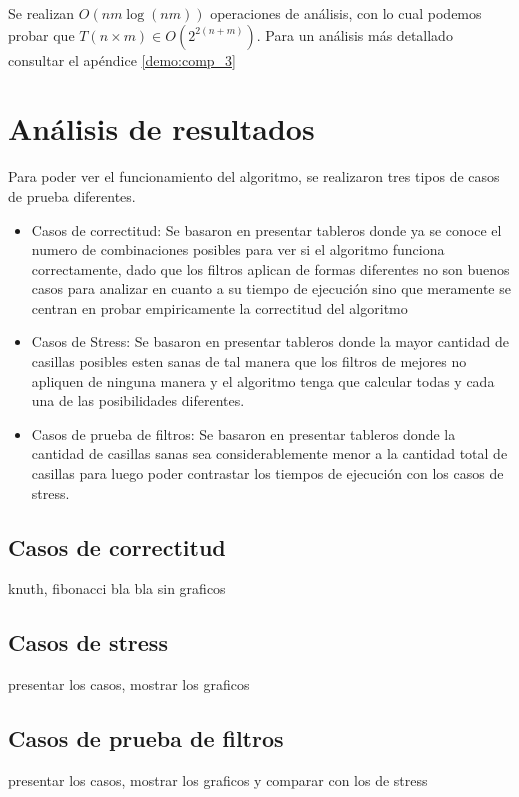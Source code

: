 \documentclass[a4paper, 12pt] {article}
\begin{document}
Se realizan $O\left( nm \log\left(  nm \right) \right) $ operaciones de an\'alisis, con lo cual podemos probar que $T\left( n \times m\right) \in O(2^{2\left( n+m\right) })$. Para un an\'alisis m\'as detallado consultar el ap\'endice \ref{demo:comp_3}



\section*{An\'alisis de resultados}
Para poder ver el funcionamiento del algoritmo, se realizaron tres tipos de casos de prueba diferentes.

\begin{itemize}
 \item Casos de correctitud: Se basaron en presentar tableros donde ya se conoce el numero de combinaciones posibles para ver si el algoritmo funciona correctamente, dado que los filtros aplican de formas diferentes no son buenos casos para analizar en cuanto a su tiempo de ejecuci\'on sino que meramente se centran en probar empiricamente la correctitud del algoritmo
\item Casos de Stress: Se basaron en presentar tableros donde la mayor cantidad de casillas posibles esten sanas de tal manera que los filtros de mejores no apliquen de ninguna manera y el algoritmo tenga que calcular todas y cada una de las posibilidades diferentes.
\item Casos de prueba de filtros: Se basaron en presentar tableros donde la cantidad de casillas sanas sea considerablemente menor a la cantidad total de casillas para luego poder contrastar los tiempos de ejecuci\'on con los casos de stress.
\end{itemize}


\subsection*{Casos de correctitud}
knuth, fibonacci bla bla
sin graficos

\subsection*{Casos de stress}
presentar los casos, mostrar los graficos

\subsection*{Casos de prueba de filtros}
presentar los casos, mostrar los graficos y comparar con los de stress
\end{document}
